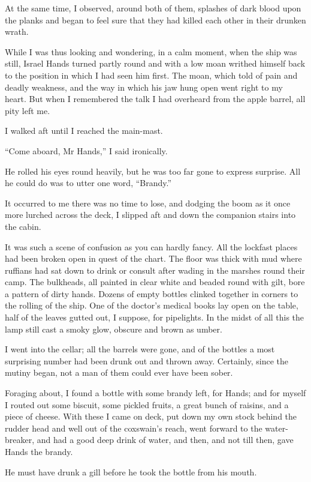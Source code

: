 At the same time, I observed, around both of them, splashes of dark blood upon the planks and began to feel sure that they had killed each other in their drunken wrath.

While I was thus looking and wondering, in a calm moment, when the ship was still, Israel Hands turned partly round and with a low moan writhed himself back to the position in which I had seen him first. The moan, which told of pain and deadly weakness, and the way in which his jaw hung open went right to my heart. But when I remembered the talk I had overheard from the apple barrel, all pity left me.

I walked aft until I reached the main-mast.

\enquote{Come aboard, Mr Hands,} I said ironically.

He rolled his eyes round heavily, but he was too far gone to express surprise. All he could do was to utter one word, \enquote{Brandy.}

It occurred to me there was no time to lose, and dodging the boom as it once more lurched across the deck, I slipped aft and down the companion stairs into the cabin.

It was such a scene of confusion as you can hardly fancy. All the lockfast places had been broken open in quest of the chart. The floor was thick with mud where ruffians had sat down to drink or consult after wading in the marshes round their camp. The bulkheads, all painted in clear white and beaded round with gilt, bore a pattern of dirty hands. Dozens of empty bottles clinked together in corners to the rolling of the ship. One of the doctor’s medical books lay open on the table, half of the leaves gutted out, I suppose, for pipelights. In the midst of all this the lamp still cast a smoky glow, obscure and brown as umber.

I went into the cellar; all the barrels were gone, and of the bottles a most surprising number had been drunk out and thrown away. Certainly, since the mutiny began, not a man of them could ever have been sober.

Foraging about, I found a bottle with some brandy left, for Hands; and for myself I routed out some biscuit, some pickled fruits, a great bunch of raisins, and a piece of cheese. With these I came on deck, put down my own stock behind the rudder head and well out of the coxswain’s reach, went forward to the water-breaker, and had a good deep drink of water, and then, and not till then, gave Hands the brandy.

He must have drunk a gill before he took the bottle from his mouth.


